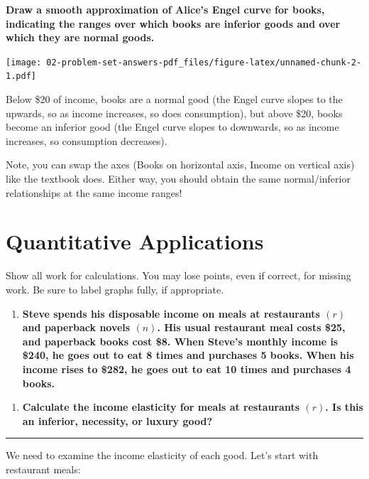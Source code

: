 \documentclass[
  11pt,
]{article}
\providecommand{\tightlist}{%
  \setlength{\itemsep}{0pt}\setlength{\parskip}{0pt}}
\begin{document}
\textbf{Draw a smooth approximation of Alice's Engel curve for books,
indicating the ranges over which books are inferior goods and over which
they are normal goods.}

\texttt{[image: 02-problem-set-answers-pdf\_files/figure-latex/unnamed-chunk-2-1.pdf]}

Below \$20 of income, books are a normal good (the Engel curve slopes to
the upwards, so as income increases, so does consumption), but above
\$20, books become an inferior good (the Engel curve slopes to
downwards, so as income increases, so consumption decreases).

Note, you can swap the axes (Books on horizontal axis, Income on
vertical axis) like the textbook does. Either way, you should obtain the
same normal/inferior relationships at the same income ranges!

\clearpage

\hypertarget{quantitative-applications}{%
\section{Quantitative Applications}\label{quantitative-applications}}

Show all work for calculations. You may lose points, even if correct,
for missing work. Be sure to label graphs fully, if appropriate.

\begin{enumerate}
\def\labelenumi{\arabic{enumi}.}
\setcounter{enumi}{4}
\tightlist
\item
  \textbf{Steve spends his disposable income on meals at restaurants
  \((r)\) and paperback novels \((n)\). His usual restaurant meal costs
  \$25, and paperback books cost \$8. When Steve's monthly income is
  \$240, he goes out to eat 8 times and purchases 5 books. When his
  income rises to \$282, he goes out to eat 10 times and purchases 4
  books.}
\end{enumerate}

\begin{enumerate}
\def\labelenumi{\alph{enumi}.}
\tightlist
\item
  \textbf{Calculate the income elasticity for meals at restaurants
  \((r)\). Is this an inferior, necessity, or luxury good?}
\end{enumerate}

\begin{center}\rule{0.5\linewidth}{0.5pt}\end{center}

We need to examine the income elasticity of each good. Let's start with
restaurant meals:
\end{document}
